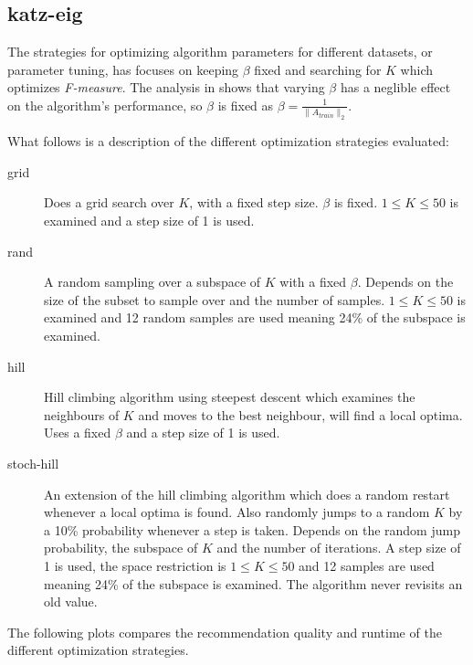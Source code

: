 
\subsection{katz-eig}\label{sec:opt:katzeig}

The strategies for optimizing algorithm parameters for different datasets, or parameter tuning, has focuses on keeping $\beta$ fixed and searching for $K$ which optimizes \textit{F-measure}. The analysis in  shows that varying $\beta$ has a neglible effect on the algorithm's performance, so $\beta$ is fixed as $\beta = \frac{1}{\|A_{train}\|_2}$.

What follows is a description of the different optimization strategies evaluated:

\begin{description}
    \item[grid]
        Does a grid search over $K$, with a fixed step size. $\beta$ is fixed. $1 \leq K \leq 50$ is examined and a step size of 1 is used.
    \item[rand]
        A random sampling over a subspace of $K$ with a fixed $\beta$. Depends on the size of the subset to sample over and the number of samples. $1 \leq K \leq 50$ is examined and 12 random samples are used meaning 24\% of the subspace is examined.
    \item[hill]
        Hill climbing algorithm using steepest descent which examines the neighbours of $K$ and moves to the best neighbour, will find a local optima. Uses a fixed $\beta$ and a step size of 1 is used.
    \item[stoch-hill]
        An extension of the hill climbing algorithm which does a random restart whenever a local optima is found. Also randomly jumps to a random $K$ by a 10\% probability whenever a step is taken. Depends on the random jump probability, the subspace of $K$ and the number of iterations. A step size of 1 is used, the space restriction is $1 \leq K \leq 50$ and 12 samples are used meaning 24\% of the subspace is examined. The algorithm never revisits an old value.
\end{description}

The following plots compares the recommendation quality and runtime of the different optimization strategies.

